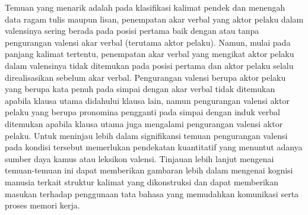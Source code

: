 Temuan yang menarik adalah pada klasifikasi kalimat pendek dan menengah data ragam tulis maupun lisan, penempatan akar verbal yang aktor pelaku dalam valensinya sering berada pada posisi pertama baik dengan atau tanpa pengurangan valensi akar verbal (terutama aktor pelaku). Namun, mulai pada panjang kalimat tertentu, penempatan akar verbal yang mengikat aktor pelaku dalam valensinya tidak ditemukan pada posisi pertama dan aktor pelaku selalu direalisasikan sebelum akar verbal. Pengurangan valensi berupa aktor pelaku yang berupa kata penuh pada simpai dengan akar verbal tidak ditemukan apabila klausa utama didahului klausa lain, namun pengurangan valensi aktor pelaku yang berupa pronomina pengganti pada simpai dengan induk verbal ditemukan apabila klausa utama juga mengalami pengurangan valensi aktor pelaku. Untuk meninjau lebih dalam signifikansi temuan pengurangan valensi pada kondisi tersebut memerlukan pendekatan kuantitatif yang menuntut adanya sumber daya kamus atau leksikon valensi. Tinjauan lebih lanjut mengenai temuan-temuan ini dapat memberikan gambaran lebih dalam mengenai kognisi manusia terkait struktur kalimat yang dikonstruksi dan dapat memberikan masukan terhadap penggunaan tata bahasa yang memudahkan komunikasi serta proses memori kerja.

